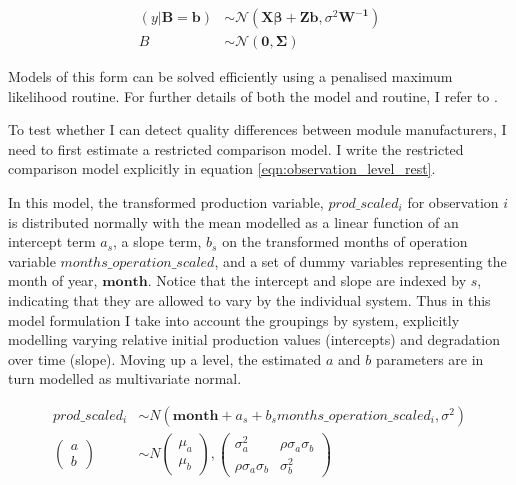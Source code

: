 \documentclass[12pt]{article}
\begin{document}
\begin{align}
(y|\mathbf{B=b}) &\sim \mathcal{N}(\mathbf{X\beta + Zb}, \sigma^2\mathbf{W^{-1}})\\
B &\sim \mathcal{N}(\mathbf{0,\Sigma})
\label{equation:lme_simple}
\end{align}

Models of this form can be solved efficiently using a penalised maximum likelihood routine. For further details of both the model and routine, I refer to \citet{bates_fitting_2015}.

To test whether I can detect quality differences between module manufacturers, I need to first estimate a restricted comparison model. I write the restricted comparison model explicitly in equation \ref{eqn:observation_level_rest}.

In this model, the transformed production variable, $prod\_scaled_{i}$ for observation $i$ is distributed normally with the mean modelled as a linear function of an intercept term $a_s$, a slope term, $b_s$ on the transformed months of operation variable $months\_operation\_scaled$, and a set of dummy variables representing the month of year, $\mathbf{month}$. Notice that the intercept and slope are indexed by $s$, indicating that they are allowed to vary by the individual system. Thus in this model formulation I take into account the groupings by system, explicitly modelling varying relative initial production values (intercepts) and degradation over time (slope). Moving up a level, the estimated $a$ and $b$ parameters are in turn modelled as multivariate normal.

\begin{equation}
\begin{aligned}
prod\_scaled_{i} &\sim N(\mathbf{month} + a_s + b_s months\_operation\_scaled_{i}, \sigma^2)\\
\begin{pmatrix}
  a\\
  b
\end{pmatrix}
&\sim N
\begin{pmatrix}
  \mu_a\\
  \mu_b
\end{pmatrix},
\begin{pmatrix}
  \sigma_a^2 & \rho \sigma_a \sigma_b \\
  \rho \sigma_a \sigma_b & \sigma_b^2
\end{pmatrix}\label{eqn:observation_level_rest}
\end{aligned}
\end{equation}
\end{document}
